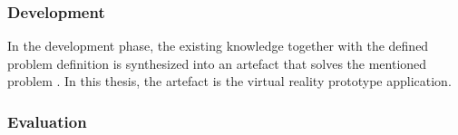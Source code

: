 
\subsubsection{Development}

In the development phase, the existing knowledge together with the defined problem definition is synthesized into an artefact that solves the mentioned problem \citep{Vaishnavi2008}. In this thesis, the artefact is the virtual reality prototype application.



\subsubsection{Evaluation}

